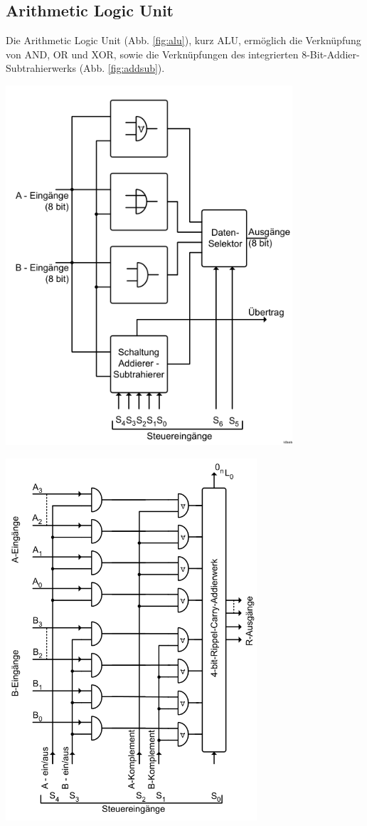 \documentclass[10pt]{article}
\newenvironment{Figure}
  {\par\medskip\noindent\minipage{\linewidth}}
  {\endminipage\par\medskip}
\begin{document}
\begin{multicols}{2}
	\subsection{Arithmetic Logic Unit}
	Die Arithmetic Logic Unit (Abb. \ref{fig:alu}), kurz ALU, ermöglich die Verknüpfung von AND, OR und XOR, sowie die Verknüpfungen des integrierten 8-Bit-Addier-Subtrahierwerks (Abb. \ref{fig:addsub}).
	\begin{Figure}
		\centering\includegraphics[width=0.8\textwidth]{alu.png}
		\label{fig:alu}
	\end{Figure}
	\begin{Figure}
		\centering\includegraphics[width=0.7\textwidth]{addier-subtrahierwerk.png}

\end{Figure}
\end{multicols}
\end{document}
